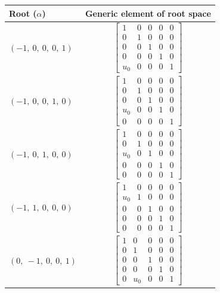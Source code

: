\documentclass[11pt]{article}
\theoremstyle{definition}
\begin{document}
\bigskip

\noindent \begin{tabular}{|l|c|}
    \hline
    \textbf{Root ($\alpha$)} & \textbf{Generic element of root space} \\
    \hline
    $\left( -1, \  0, \  0, \  0, \  1\right)$ & $\left[\begin{matrix}1 & 0 & 0 & 0 & 0\\0 & 1 & 0 & 0 & 0\\0 & 0 & 1 & 0 & 0\\0 & 0 & 0 & 1 & 0\\u_{0} & 0 & 0 & 0 & 1\end{matrix}\right]$ \\
    \hline
    $\left( -1, \  0, \  0, \  1, \  0\right)$ & $\left[\begin{matrix}1 & 0 & 0 & 0 & 0\\0 & 1 & 0 & 0 & 0\\0 & 0 & 1 & 0 & 0\\u_{0} & 0 & 0 & 1 & 0\\0 & 0 & 0 & 0 & 1\end{matrix}\right]$ \\
    \hline
    $\left( -1, \  0, \  1, \  0, \  0\right)$ & $\left[\begin{matrix}1 & 0 & 0 & 0 & 0\\0 & 1 & 0 & 0 & 0\\u_{0} & 0 & 1 & 0 & 0\\0 & 0 & 0 & 1 & 0\\0 & 0 & 0 & 0 & 1\end{matrix}\right]$ \\
    \hline
    $\left( -1, \  1, \  0, \  0, \  0\right)$ & $\left[\begin{matrix}1 & 0 & 0 & 0 & 0\\u_{0} & 1 & 0 & 0 & 0\\0 & 0 & 1 & 0 & 0\\0 & 0 & 0 & 1 & 0\\0 & 0 & 0 & 0 & 1\end{matrix}\right]$ \\
    \hline
    $\left( 0, \  -1, \  0, \  0, \  1\right)$ & $\left[\begin{matrix}1 & 0 & 0 & 0 & 0\\0 & 1 & 0 & 0 & 0\\0 & 0 & 1 & 0 & 0\\0 & 0 & 0 & 1 & 0\\0 & u_{0} & 0 & 0 & 1\end{matrix}\right]$ \\

\end{tabular}
\end{document}
